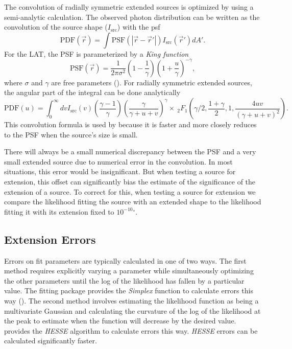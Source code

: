 \documentclass[12pt,preprint]{aastex}
\renewcommand{\deg}{\ensuremath{^\circ}\xspace}
\newcommand{\pointlike}{\text{\em pointlike}\xspace}
\newcommand{\minuit}{\text{\em Minuit}\xspace}
\begin{document}
The convolution of radially symmetric extended sources is optimized by
using a semi-analytic calculation.  The observed photon distribution
can be written as the convolution of the source shape ($I_\text{src}$)
with the psf
\begin{equation}
  \text{PDF}(\vec r) = \int  \text{PSF}(|\vec r - \vec r'|)I_\text{src}(\vec r') d A'.
\end{equation}
For the LAT, the PSF is parameterized by a {\em King function}
\begin{equation}
  \text{PSF}(\vec r) = 
  \frac{1}{2\pi\sigma^2}
  \left(1-\frac{1}{\gamma}\right)
  \left(1+\frac{u}{\gamma}\right)^{-\gamma},
\end{equation}
where $\sigma$ and $\gamma$ are free parameters
(\cite{matthew_kerr_thesis}).  For radially symmetric extended sources,
the angular part of the integral can be done analytically
\begin{equation}
  \text{PDF}(u)= \int_0^\infty dv
  I_\text{src}(v) 
  \left(\frac{\gamma-1}{\gamma}\right)
  \left( \frac{\gamma}{\gamma + u + v}\right)^\gamma 
  \times ~_2F_1 \left(\gamma/2,\frac{1+\gamma}{2},1,\frac{4uv}{(\gamma+u+v)^2}\right).
\end{equation}
This convolution formula is used by \pointlike because it is faster
and more closely reduces to the PSF when the source's size is 
small.

There will always be a small numerical discrepancy between the PSF and
a very small extended source due to numerical error in the convolution.
In most situations, this error would be insignificant. But when testing
a source for extension, this offset can significantly bias the estimate
of the significance of the extension of a source.  To correct for this,
when testing a source for extension we compare the likelihood fitting
the source with an extended shape to the likelihood fitting it with its
extension fixed to ${10^{-10}}\deg$.

\subsection{Extension Errors}
\label{extension_error}

Errors on fit parameters are typically calculated in one of two
ways. The first method requires explicitly varying a parameter
while simultaneously optimizing the other parameters
until the log of the likelihood has fallen by a particular value.
The \minuit fitting
package provides the {\em Simplex} function to calculate errors this way
(\cite{minuit_documentation}).  The second method involves estimating the
likelihood function as being a multivariate Gaussian and calculating the
curvature of the log of the likelihood at the peak to estimate when the
function will decrease by the desired value. \minuit provides the {\em HESSE}
algorithm to calculate errors this way.  {\em HESSE} errors 
can be calculated significantly faster.
\end{document}
